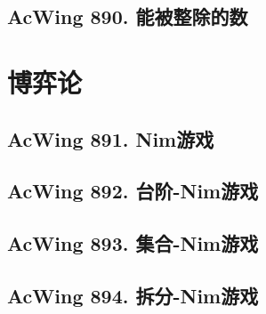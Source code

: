 \subsection{AcWing 890. 能被整除的数}


\section{博弈论}

\subsection{AcWing 891. Nim游戏}

\subsection{AcWing 892. 台阶-Nim游戏}

\subsection{AcWing 893. 集合-Nim游戏}

\subsection{AcWing 894. 拆分-Nim游戏}
